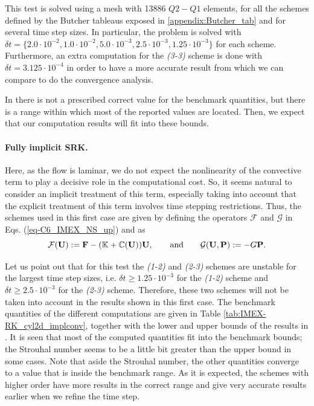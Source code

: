This test is solved using a mesh with 13886 $Q2-Q1$ elements, for all the schemes defined by the Butcher tableaus exposed in \ref{appendix:Butcher_tab} and for several time step sizes. In particular, the problem is solved with $\delta t=\{2.0\cdot10^{-2},1.0\cdot10^{-2},5.0\cdot10^{-3},2.5\cdot10^{-3},1.25\cdot10^{-3}\}$ for each scheme. Furthermore, an extra computation for the \textit{(3-3)} scheme is done with $\delta t=3.125\cdot10^{-4}$ in order to have a more accurate result from which we can compare to do the convergence analysis.

In \cite{schafer_benchmark_1996} there is not a prescribed correct value for the benchmark quantities, but there is a range within which most of the reported values are located. Then, we expect that our computation results will fit into these bounds.

\paragraph{Fully implicit SRK.}

Here, as the flow is laminar, we do not expect the nonlinearity of the convective term to play a decisive role in the computational cost. So, it seems natural to consider an implicit treatment of this term, especially taking into account that the explicit treatment of this term involves time stepping restrictions. Thus, the schemes used in this first case are given by defining the operators $\mathcal{F}$ and $\mathcal{G}$ in Eqs. (\ref{eq-C6_IMEX_NS_up}) and  as
$$\mathcal{F}({\bf U}):={\bf F}-(\mathbb{K}+\mathbb{C}({\bf U})){\bf U},\quad\quad\mbox{and}\quad\quad\mathcal{G}({\bf U},{\bf P}):=-G{\bf P}.$$

Let us point out that for this test the \textit{(1-2)} and \textit{(2-3)} schemes are unstable for the largest time step sizes, {i.e.} $\delta t\geq 1.25\cdot10^{-3}$ for the \textit{(1-2)} scheme and $\delta t\geq2.5\cdot10^{-3}$ for the \textit{(2-3)} scheme. Therefore, these two schemes will not be taken into account in the results shown in this first case. The benchmark quantities of the different computations are given in Table \ref{tab:IMEX-RK_cyl2d_implconv}, together with the lower and upper bounds of the results in \cite{schafer_benchmark_1996}. It is seen that most of the computed quantities fit into the benchmark bounds; the Strouhal number seems to be a little bit greater than the upper bound in some cases. Note that aside the Strouhal number, the other quantities converge to a value that is inside the benchmark range. As it is expected, the schemes with higher order have more results in the correct range and give very accurate results earlier when we refine the time step.

